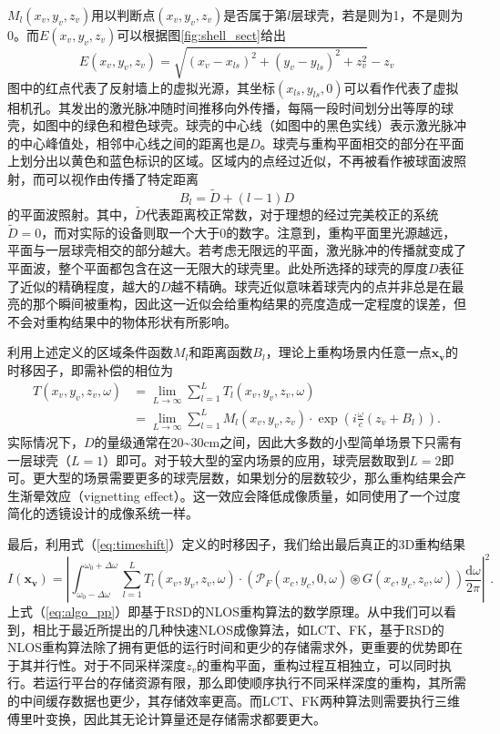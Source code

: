 \documentclass[master]{shtthesis}             %
\begin{document}
$M_l(x_v,y_v,z_v)$用以判断点$(x_v,y_v,z_v)$是否属于第$l$层球壳，若是则为1，不是则为0。而$E(x_v,y_v,z_v)$可以根据图\ref{fig:shell_sect}给出
\begin{equation}
  E(x_v,y_v,z_v) = \sqrt{(x_v-x_{ls})^2+(y_v-y_{ls})^2+z_v^2} - z_v
\end{equation}
图中的红点代表了反射墙上的虚拟光源，其坐标$(x_{ls},y_{ls},0)$可以看作代表了虚拟相机孔。其发出的激光脉冲随时间推移向外传播，每隔一段时间划分出等厚的球壳，如图中的绿色和橙色球壳。球壳的中心线（如图中的黑色实线）表示激光脉冲的中心峰值处，相邻中心线之间的距离也是$D$。球壳与重构平面相交的部分在平面上划分出以黄色和蓝色标识的区域。区域内的点经过近似，不再被看作被球面波照射，而可以视作由传播了特定距离
\begin{equation}
  B_l = \tilde{D} + (l-1) D
\end{equation}
的平面波照射。其中，$\tilde{D}$代表距离校正常数，对于理想的经过完美校正的系统$\tilde{D}=0$，而对实际的设备则取一个大于0的数字。注意到，重构平面里光源越远，平面与一层球壳相交的部分越大。若考虑无限远的平面，激光脉冲的传播就变成了平面波，整个平面都包含在这一无限大的球壳里。此处所选择的球壳的厚度$D$表征了近似的精确程度，越大的$D$越不精确。球壳近似意味着球壳内的点并非总是在最亮的那个瞬间被重构，因此这一近似会给重构结果的亮度造成一定程度的误差，但不会对重构结果中的物体形状有所影响。

利用上述定义的区域条件函数$M_l$和距离函数$B_l$，理论上重构场景内任意一点$\mathbf{x_v}$的时移因子，即需补偿的相位为
\begin{equation}
  \begin{split}\label{eq:timeshift}
    T(x_v,y_v,z_v,\omega) &= \lim_{L\rightarrow \infty} \sum_{l=1}^L T_l(x_v,y_v,z_v,\omega) \\
    &= \lim_{L\rightarrow \infty} \sum_{l=1}^LM_l(x_v,y_v,z_v)\cdot \exp \left( i\frac{\omega}{c} (z_v+B_l) \right).
  \end{split}
\end{equation}
实际情况下，$D$的量级通常在20\textasciitilde30cm之间，因此大多数的小型简单场景下只需有一层球壳（$L=1$）即可。对于较大型的室内场景的应用，球壳层数取到$L=2$即可。更大型的场景需要更多的球壳层数，如果划分的层数较少，那么重构结果会产生渐晕效应（vignetting effect）。这一效应会降低成像质量，如同使用了一个过度简化的透镜设计的成像系统一样。

最后，利用式（\ref{eq:timeshift}）定义的时移因子，我们给出最后真正的3D重构结果
\begin{equation}\label{eq:algo_pp}
  I(\mathbf{x_v}) =\left\lvert \int_{\omega_0-\Delta\omega}^{\omega_0+\Delta\omega} \sum_{l=1}^L T_l(x_v,y_v,z_v,\omega) \cdot \left(\mathcal{P}_F(x_c,y_c,0,\omega)\circledast G(x_c,y_c,z_v,\omega)\right) \frac{\text{d}\omega}{2\pi} \right\rvert^2.
\end{equation} 
上式（\ref{eq:algo_pp}）即基于RSD的NLOS重构算法的数学原理。从中我们可以看到，相比于最近所提出的几种快速NLOS成像算法，如LCT、FK，基于RSD的NLOS重构算法除了拥有更低的运行时间和更少的存储需求外，更重要的优势即在于其并行性。对于不同采样深度$z_v$的重构平面，重构过程互相独立，可以同时执行。若运行平台的存储资源有限，那么即使顺序执行不同采样深度的重构，其所需的中间缓存数据也更少，其存储效率更高。而LCT、FK两种算法则需要执行三维傅里叶变换，因此其无论计算量还是存储需求都要更大。
\end{document}
